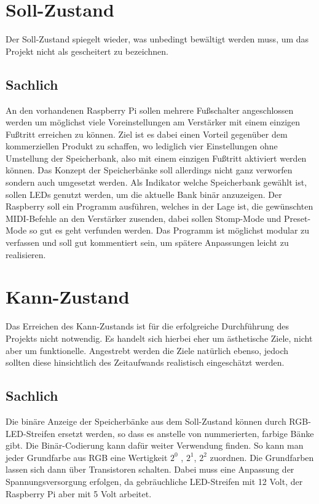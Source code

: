 \section{Soll-Zustand}

Der Soll-Zustand spiegelt wieder, was unbedingt bewältigt werden muss, um das Projekt nicht als gescheitert zu bezeichnen.

	\subsection{Sachlich}

	An den vorhandenen Raspberry Pi sollen mehrere Fußschalter angeschlossen werden um möglichst viele Voreinstellungen am Verstärker mit einem einzigen Fußtritt erreichen zu können. Ziel ist es dabei einen Vorteil gegenüber dem kommerziellen Produkt zu schaffen, wo lediglich vier Einstellungen ohne Umstellung der Speicherbank, also mit einem einzigen Fußtritt aktiviert werden können.
	Das Konzept der Speicherbänke soll allerdings nicht ganz verworfen sondern auch umgesetzt werden. Als Indikator welche Speicherbank gewählt ist, sollen LEDs genutzt werden, um die aktuelle Bank binär anzuzeigen.
	Der Raspberry soll ein Programm ausführen, welches in der Lage ist, die gewünschten MIDI-Befehle an den Verstärker zusenden, dabei sollen Stomp-Mode und Preset-Mode so gut es geht verfunden werden. Das Programm ist möglichst modular zu verfassen und soll gut kommentiert sein, um spätere Anpassungen leicht zu realisieren. 
	 



\section{Kann-Zustand}

Das Erreichen des Kann-Zustands ist für die erfolgreiche Durchführung des Projekts nicht notwendig. Es handelt sich hierbei eher um ästhetische Ziele, nicht aber um funktionelle. Angestrebt werden die Ziele natürlich ebenso, jedoch sollten diese hinsichtlich des Zeitaufwands realistisch eingeschätzt werden.

	\subsection{Sachlich}

	Die binäre Anzeige der Speicherbänke aus dem Soll-Zustand können durch RGB-LED-Streifen ersetzt werden, so dass es anstelle von nummerierten, farbige Bänke gibt. Die Binär-Codierung kann dafür weiter Verwendung finden. So kann man jeder Grundfarbe aus RGB eine Wertigkeit $2^{0}$ , $2^{1}$, $2^{2}$ zuordnen. Die Grundfarben lassen sich dann über Transistoren schalten. Dabei muss eine Anpassung der Spannungsversorgung erfolgen, da gebräuchliche LED-Streifen mit 12 Volt, der Raspberry Pi aber mit 5 Volt arbeitet.
	
